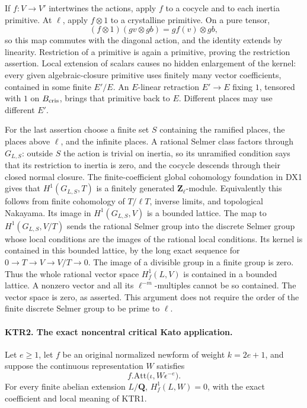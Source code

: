 \documentclass[11pt,a4paper]{article}
\numberwithin{equation}{section}
\theoremstyle{remark}\newtheorem{remark}[theorem]{Remark}
\begin{document}
If \(f:V\to V'\) intertwines the actions, apply \(f\) to a
cocycle and to each inertia primitive.  At \(\ell\), apply
\(f\otimes1\) to a crystalline primitive.  On a pure tensor,
\[
 (f\otimes1)(g v\otimes g b)=g f(v)\otimes g b,
\]
so this map commutes with the diagonal action, and the identity
extends by linearity.  Restriction of a primitive is again a
primitive, proving the restriction assertion.  Local extension of
scalars causes no hidden enlargement of the kernel: every given
algebraic-closure primitive uses finitely many vector coefficients,
contained in some finite \(E'/E\).  An \(E\)-linear retraction
\(E'\to E\) fixing \(1\), tensored with \(1\) on
\(B_{\rm cris}\), brings that primitive back to \(E\).
Different places may use different \(E'\).

For the last assertion choose a finite set \(S\) containing the
ramified places, the places above \(\ell\), and the infinite
places.  A rational Selmer class factors through \(G_{L,S}\):
outside \(S\) the action is trivial on inertia, so its
unramified condition says that its restriction to inertia is
zero, and the cocycle descends through their closed normal closure.
The finite-coefficient global cohomology foundation in DX1 gives
that \(H^1(G_{L,S},T)\) is a finitely generated
\(\mathbf Z_\ell\)-module.  Equivalently this follows from
finite cohomology of \(T/\ell T\), inverse limits, and
topological Nakayama.  Its image in \(H^1(G_{L,S},V)\) is a
bounded lattice.  The map to \(H^1(G_{L,S},V/T)\) sends the
rational Selmer group into the discrete Selmer group whose local
conditions are the images of the rational local conditions.
Its kernel is contained in this bounded lattice, by the long
exact sequence for \(0\to T\to V\to V/T\to0\).
The image of a divisible group in a finite group is zero.
Thus the whole rational vector space \(H^1_f(L,V)\) is contained
in a bounded lattice.  A nonzero vector and all its
\(\ell^{-m}\)-multiples cannot be so contained.  The vector
space is zero, as asserted.  This argument does not require the
order of the finite discrete Selmer group to be prime to \(\ell\).

\paragraph{KTR2. The exact noncentral critical Kato application.}
\label{claim:KTR2}
Let \(e\ge1\), let \(f\) be an original normalized newform
of weight \(k=2e+1\), and suppose the continuous representation
\(W\) satisfies
\[
             f.\mathrm{Att}\bigl(\iota,W\epsilon^{-e}\bigr).
 \tag{KTR.2}
\]
For every finite abelian extension \(L/\mathbf Q\),
\(H^1_f(L,W)=0\), with the exact coefficient and local meaning
of KTR1.
\end{document}
